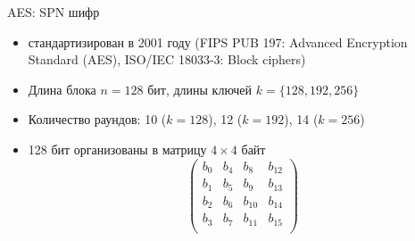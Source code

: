 \documentclass[usenames,dvipsnames,8pt,aspectratio=169]{beamer}
\begin{document}
\begin{frame}{AES:  SPN шифр}
\Large 
\begin{itemize}
	\itemsep 10pt
	\item стандартизирован в 2001 году (FIPS PUB 197: Advanced Encryption Standard (AES), ISO/IEC 18033-3: Block ciphers)
	\item Длина блока $n = 128 $ бит, длины ключей $k = \{128, 192, 256 \}$
	\item Количество раундов: 10 ($k = 128$), 12 ($k=192$), 14 ($k=256$)
	\item 128 бит организованы в матрицу $4 \times 4$ байт
	\[
	\begin{pmatrix}
	b_0 & b_4 & b_8 & b_{12} \\
	b_1 & b_5 & b_9 & b_{13} \\
	b_2 & b_6 & b_{10} & b_{14} \\
	b_3 & b_7 & b_{11} & b_{15}  \\
	\end{pmatrix}
	\]
\end{itemize}
	
\end{frame}
\end{document}
